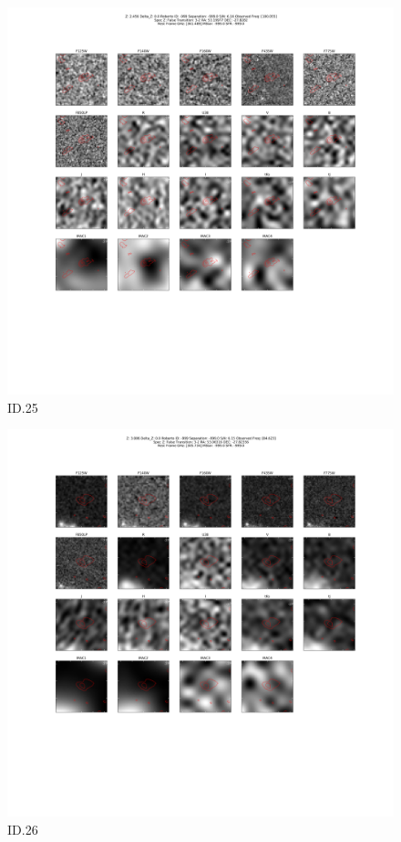 \begin{figure}[tbp]
\centering \includegraphics[width=120mm]{Matched/ASPECS_Cutout_25.png}
\caption{ID.25}
\label{fig:Match_Three}
\end{figure}

\begin{figure}[tbp]
\centering \includegraphics[width=120mm]{Matched/ASPECS_Cutout_26.png}
\caption{ID.26}
\label{fig:Match_Three}
\end{figure}

